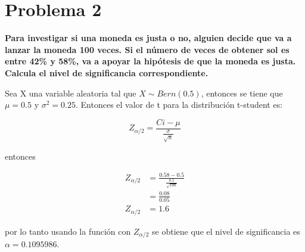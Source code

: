 \section*{Problema 2}

\textbf{Para investigar si una moneda es justa o no, alguien decide que va a lanzar la moneda 100 veces. Si el número de veces de obtener sol es entre 42\% y 58\%, va a apoyar la hipótesis de que la moneda es justa. Calcula el nivel de significancia correspondiente.}


Sea X una variable aleatoria tal que $X\sim Bern(0.5)$, entonces se tiene que $\mu=0.5$ y $\sigma^2 = 0.25$. Entonces el valor de  t para la distribución t-student es:

\begin{equation*}
    Z_{\alpha/2} = \frac{Ci-\mu}{\frac{\sigma}{\sqrt{n}}}
\end{equation*}

entonces

\begin{align*}
    Z_{\alpha/2} & = \frac{0.58-0.5}{\frac{0.5}{\sqrt{100}}} \\
                 & = \frac{0.08}{0.05}                       \\
    Z_{\alpha/2} & = 1.6
\end{align*}

por lo tanto usando la función  con $Z_{\alpha/2}$ se obtiene que el nivel de significancia es $\alpha=0.1095986$.